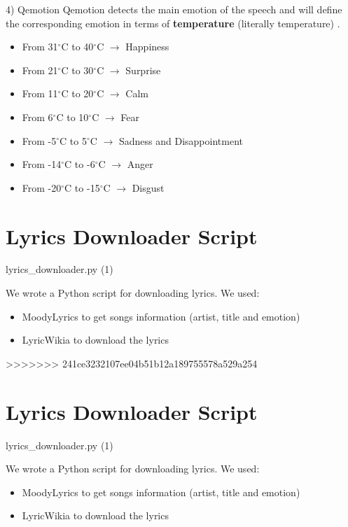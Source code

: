 \documentclass[xcolor=dvipsnames]{beamer}
\begin{document}
\begin{frame}{4) Qemotion}
Qemotion detects the main emotion of the speech and will define the corresponding emotion in terms of \textbf{temperature} (literally temperature) \cite{p5}.
\begin{itemize}
\item From 31$^\circ$C to 40$^\circ$C $\rightarrow$ Happiness
\item From 21$^\circ$C to 30$^\circ$C $\rightarrow$ Surprise
\item From 11$^\circ$C to 20$^\circ$C $\rightarrow$ Calm
\item From 6$^\circ$C to 10$^\circ$C $\rightarrow$ Fear
\item From -5$^\circ$C to 5$^\circ$C $\rightarrow$ Sadness and Disappointment
\item From -14$^\circ$C to -6$^\circ$C $\rightarrow$ Anger
\item From -20$^\circ$C to -15$^\circ$C $\rightarrow$ Disgust
\end{itemize}
\end{frame}

\section{Lyrics Downloader Script}
\begin{frame}{lyrics\_downloader.py (1)}

We wrote a Python script for downloading lyrics. We used:
\begin{itemize}
\item MoodyLyrics to get songs information (artist, title and emotion)
\item LyricWikia to download the lyrics
\end{itemize}

\end{frame}

>>>>>>> 241ce3232107ee04b51b12a189755578a529a254
\section{Lyrics Downloader Script}
\begin{frame}{lyrics\_downloader.py (1)}

We wrote a Python script for downloading lyrics. We used:
\begin{itemize}
\item MoodyLyrics to get songs information (artist, title and emotion)
\item LyricWikia to download the lyrics
\end{itemize}

\end{frame}
\end{document}
